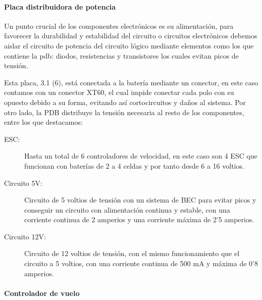 \paragraph{Placa distribuidora de potencia}\label{SSS:PlacaDistribuidora}
Un punto crucial de los componentes electrónicos es su alimentación, para favorecer la durabilidad y estabilidad del circuito o circuitos electrónicos debemos aislar el circuito de potencia del circuito lógico mediante elementos como los que contiene la \ac{pdb}: diodos, resistencias y transistores los cuales evitan picos de tensión.


Esta placa, 3.1 (6), está conectada a la batería mediante un conector, en este caso contamos con un conector XT60, el cual impide conectar cada polo con su opuesto debido a su forma, evitando así cortocircuitos y daños al sistema.
Por otro lado, la PDB distribuye la tensión necesaria al resto de los componentes, entre los que destacamos:



\begin{description}
        \item[ESC:] Hasta un total de 6 controladores de velocidad, en este caso son 4 ESC que funcionan con baterías de 2 a 4 celdas y por tanto desde 6 a 16 voltios.
        \item [Circuito 5V:] Circuito de 5 voltios de tensión con un sistema de BEC para evitar picos y conseguir un circuito con alimentación continua y estable, con una corriente continua de 2 amperios y una corriente máxima de 2'5 amperios.
        \item [Circuito 12V:] Circuito de 12 voltios de tensión, con el mismo funcionamiento que el circuito a 5 voltios, con una corriente continua de 500 mA y máxima de 0'8 amperios.
\end{description}


\paragraph{Controlador de vuelo}
\label{SSS:Controlador de vuelo}

